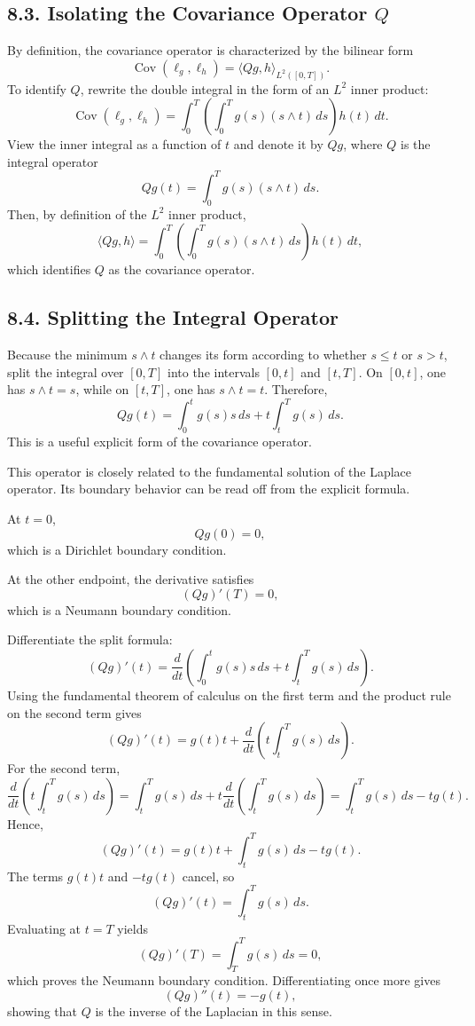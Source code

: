 \documentclass[11pt]{article}
\theoremstyle{definition}
\theoremstyle{remark}
\begin{document}
\subsection*{8.3. Isolating the Covariance Operator $Q$}
By definition, the covariance operator is characterized by the bilinear form
\[
\operatorname{Cov}(\ell_g,\ell_h)=\langle Qg,h\rangle_{L^2([0,T])}.
\]
To identify $Q$, rewrite the double integral in the form of an $L^2$ inner product:
\[
\operatorname{Cov}(\ell_g,\ell_h)
=
\int_0^T \left(\int_0^T g(s)(s\wedge t)\,ds\right)h(t)\,dt.
\]
View the inner integral as a function of $t$ and denote it by $Qg$, where $Q$ is the integral operator
\[
Qg(t)=\int_0^T g(s)(s\wedge t)\,ds.
\]
Then, by definition of the $L^2$ inner product,
\[
\langle Qg,h\rangle
=
\int_0^T \left(\int_0^T g(s)(s\wedge t)\,ds\right)h(t)\,dt,
\]
which identifies $Q$ as the covariance operator.

\subsection*{8.4. Splitting the Integral Operator}
Because the minimum $s\wedge t$ changes its form according to whether $s\le t$ or $s>t$, split the integral over $[0,T]$ into the intervals $[0,t]$ and $[t,T]$. On $[0,t]$, one has $s\wedge t=s$, while on $[t,T]$, one has $s\wedge t=t$. Therefore,
\[
Qg(t)
=
\int_0^t g(s)s\,ds+t\int_t^T g(s)\,ds.
\]
This is a useful explicit form of the covariance operator.

This operator is closely related to the fundamental solution of the Laplace operator. Its boundary behavior can be read off from the explicit formula.

At $t=0$,
\[
Qg(0)=0,
\]
which is a Dirichlet boundary condition.

At the other endpoint, the derivative satisfies
\[
(Qg)'(T)=0,
\]
which is a Neumann boundary condition.

Differentiate the split formula:
\[
(Qg)'(t)
=
\frac{d}{dt}\left(\int_0^t g(s)s\,ds+t\int_t^T g(s)\,ds\right).
\]
Using the fundamental theorem of calculus on the first term and the product rule on the second term gives
\[
(Qg)'(t)
=
g(t)t+\frac{d}{dt}\left(t\int_t^T g(s)\,ds\right).
\]
For the second term,
\[
\frac{d}{dt}\left(t\int_t^T g(s)\,ds\right)
=
\int_t^T g(s)\,ds+t\frac{d}{dt}\left(\int_t^T g(s)\,ds\right)
=
\int_t^T g(s)\,ds-tg(t).
\]
Hence,
\[
(Qg)'(t)=g(t)t+\int_t^T g(s)\,ds-tg(t).
\]
The terms $g(t)t$ and $-tg(t)$ cancel, so
\[
(Qg)'(t)=\int_t^T g(s)\,ds.
\]
Evaluating at $t=T$ yields
\[
(Qg)'(T)=\int_T^T g(s)\,ds=0,
\]
which proves the Neumann boundary condition. Differentiating once more gives
\[
(Qg)''(t)=-g(t),
\]
showing that $Q$ is the inverse of the Laplacian in this sense.
\end{document}

